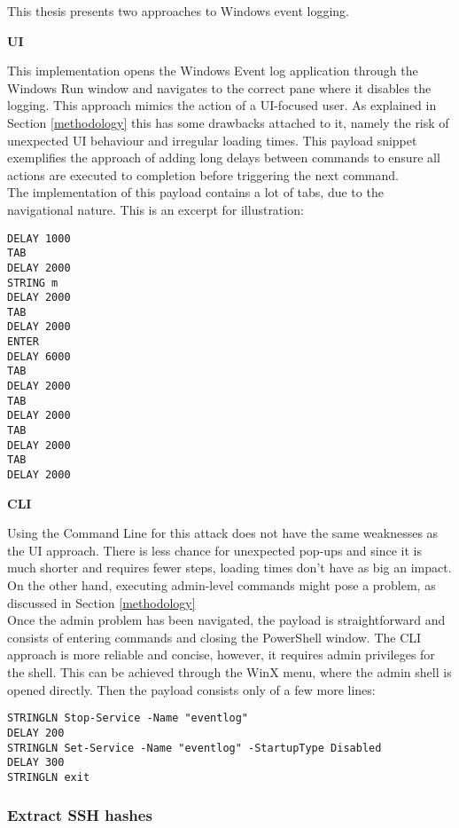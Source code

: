 This thesis presents two approaches to Windows event logging.

\textbf{UI} 

This implementation opens the Windows Event log application through the Windows Run window and navigates to the correct pane where it disables the logging.
This approach mimics the action of a UI-focused user. As explained in Section \ref{methodology} this has some drawbacks attached to it, namely the risk of unexpected UI behaviour and irregular loading times. This payload snippet exemplifies the approach of adding long delays between commands to ensure all actions are executed to completion before triggering the next command.\\
The implementation of this payload contains a lot of tabs, due to the navigational nature. This is an excerpt for illustration:

\begin{lstlisting}[caption={Exceprt: disable Windows Event Logging by navigating UI}, captionpos=b]
DELAY 1000
TAB
DELAY 2000
STRING m
DELAY 2000
TAB
DELAY 2000
ENTER
DELAY 6000
TAB
DELAY 2000
TAB
DELAY 2000
TAB
DELAY 2000
TAB
DELAY 2000
\end{lstlisting}

\textbf{CLI}

Using the Command Line for this attack does not have the same weaknesses as the UI approach. There is less chance for unexpected pop-ups and since it is much shorter and requires fewer steps, loading times don't have as big an impact. On the other hand, executing admin-level commands might pose a problem, as discussed in Section \ref{methodology} \\

Once the admin problem has been navigated, the payload is straightforward and consists of entering commands and closing the PowerShell window.
The CLI approach is more reliable and concise, however, it requires admin privileges for the shell. This can be achieved through the WinX menu, where the admin shell is opened directly. Then the payload consists only of a few more lines:

\begin{lstlisting}[caption={Exceprt: disable Windows Event Logging through PowerShell}, captionpos=b]
STRINGLN Stop-Service -Name "eventlog"
DELAY 200
STRINGLN Set-Service -Name "eventlog" -StartupType Disabled
DELAY 300
STRINGLN exit
\end{lstlisting}


\subsubsection{Extract SSH hashes}


